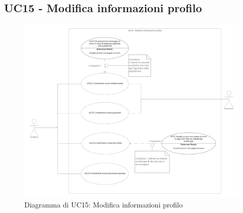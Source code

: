 \subsection{UC15 - Modifica informazioni profilo}
\label{UC15}
\begin{figure}[H]
    \centering
    \includegraphics[width=\textwidth]{Immagini/DiagrammiUC/UC15ModificaInformazioniProfilo}
    \caption{Diagramma di UC15: Modifica informazioni profilo} 
    \label{fig:VisualizzazioneProdottiNelCarrello}
\end{figure}

